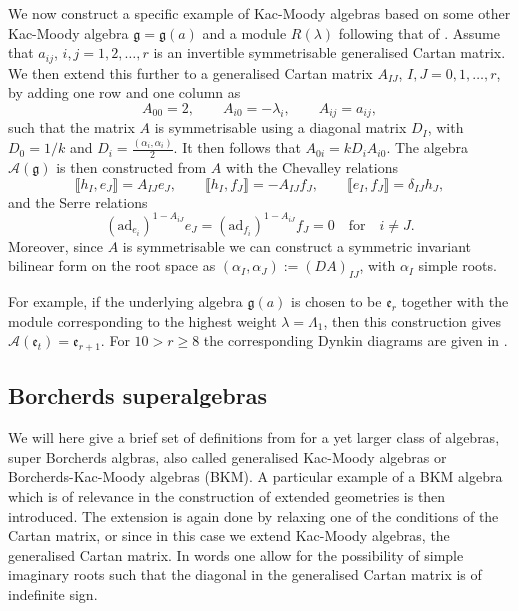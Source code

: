 We now construct a specific example of Kac-Moody algebras based on some other Kac-Moody algebra $\mathfrak{g}=\mathfrak{g}(a)$ and a module $R(\lambda)$ following that of \cite{CederwallPalmkvist2017}. Assume that $a_{ij}$, $i,j=1,2,\ldots,r$ is an invertible symmetrisable generalised Cartan matrix. We then extend this further to a generalised Cartan matrix $A_{IJ}$, $I,J=0,1,\ldots,r$, by adding one row and one column as 
\begin{equation}
    A_{00}=2,\qquad A_{i0} = -\lambda_i,\qquad A_{ij} = a_{ij},
\end{equation}
such that the matrix $A$ is symmetrisable using a diagonal matrix $D_I$, with $D_0=1/k$ and $D_i = \frac{(\alpha_i,\alpha_i)}{2}$. It then follows that $A_{0i}=kD_iA_{i0}$. The algebra $\mathscr{A}(\mathfrak{g})$ is then constructed from $A$ with the Chevalley relations 
\begin{equation}
    \llbracket h_I,e_J\rrbracket = A_{IJ}e_J,\qquad \llbracket h_I,f_J\rrbracket = -A_{IJ}f_J,\qquad \llbracket e_I,f_J\rrbracket = \delta_{IJ}h_J,
\end{equation}
and the Serre relations 
\begin{equation}\label{eq:SerreKacMoody}
    (\text{ad}_{e_i})^{1-A_{iJ}}e_J = (\text{ad}_{f_i})^{1-A_{iJ}}f_J = 0 \quad \text{for} \quad i\neq J.
\end{equation}
Moreover, since $A$ is symmetrisable we can construct a symmetric invariant bilinear form on the root space as $(\alpha_I,\alpha_J):=(DA)_{IJ}$, with $\alpha_I$ simple roots. 

For example, if the underlying algebra $\mathfrak{g}(a)$ is chosen to be $\mathfrak{e}_r$ together with the module corresponding to the highest weight $\lambda =\Lambda_1$, then this construction gives $\mathscr{A}(\mathfrak{e}_t)=\mathfrak{e}_{r+1}$. For $10>r\geq 8$ the corresponding Dynkin diagrams are given in . 

\subsection{Borcherds superalgebras}\label{sec:Borcherds}

We will here give a brief set of definitions from \cite{Ray2006} for a yet larger class of algebras, super Borcherds algbras, also called generalised Kac-Moody algebras or Borcherds-Kac-Moody algebras (BKM). A particular example of a BKM algebra which is of relevance in the construction of extended geometries is then introduced. The extension is again done by relaxing one of the conditions of the Cartan matrix, or since in this case we extend Kac-Moody algebras, the generalised Cartan matrix. In words one allow for the possibility of simple imaginary roots such that the diagonal in the generalised Cartan matrix is of indefinite sign.

